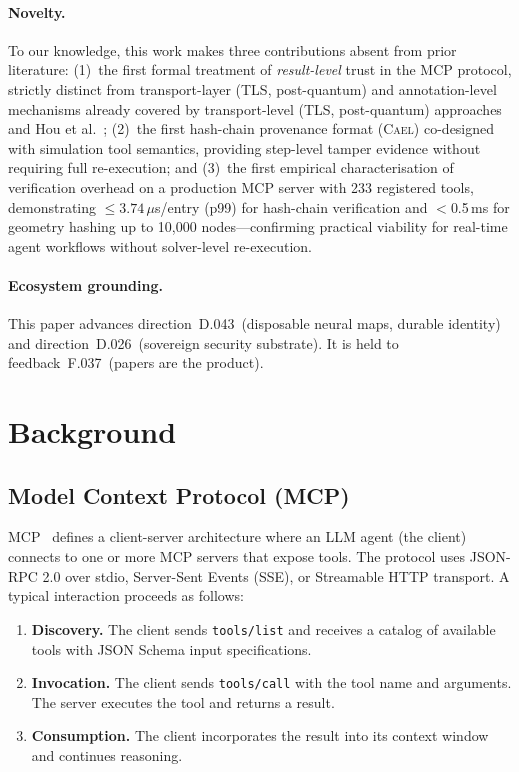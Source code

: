 \documentclass[letterpaper,twocolumn,10pt]{article}
\newcommand{\cael}{\textsc{Cael}}
\begin{document}

\paragraph{Novelty.} To our knowledge, this work makes three contributions
absent from prior literature: (1)~the first formal treatment of
\emph{result-level} trust in the MCP protocol, strictly distinct from
transport-layer (TLS, post-quantum) and annotation-level mechanisms already
covered by transport-level (TLS, post-quantum) approaches and Hou et al.~\cite{hou2025mcp};
(2)~the first hash-chain provenance format (\cael{}) co-designed with
simulation tool semantics, providing step-level tamper evidence without
requiring full re-execution; and (3)~the first empirical characterisation of
verification overhead on a production MCP server with 233 registered tools,
demonstrating $\leq 3.74\,\mu$s/entry (p99) for hash-chain verification and
$<$0.5\,ms for geometry hashing up to 10{,}000 nodes---confirming practical
viability for real-time agent workflows without solver-level re-execution.



\paragraph{Ecosystem grounding.} This paper advances direction~D.043~(disposable neural maps, durable identity) and direction~D.026~(sovereign security substrate). It is held to feedback~F.037~(papers are the product).

\section{Background}
\label{sec:background}

\subsection{Model Context Protocol (MCP)}

MCP~\cite{mcp-spec} defines a client-server architecture where an LLM agent
(the client) connects to one or more MCP servers that expose tools. The
protocol uses JSON-RPC 2.0 over stdio, Server-Sent Events (SSE), or
Streamable HTTP transport. A typical interaction proceeds as follows:

\begin{enumerate}[nosep,leftmargin=*]
\item \textbf{Discovery.} The client sends \texttt{tools/list} and receives a
  catalog of available tools with JSON Schema input specifications.
\item \textbf{Invocation.} The client sends \texttt{tools/call} with the tool
  name and arguments. The server executes the tool and returns a result.
\item \textbf{Consumption.} The client incorporates the result into its
  context window and continues reasoning.
\end{enumerate}
\end{document}
